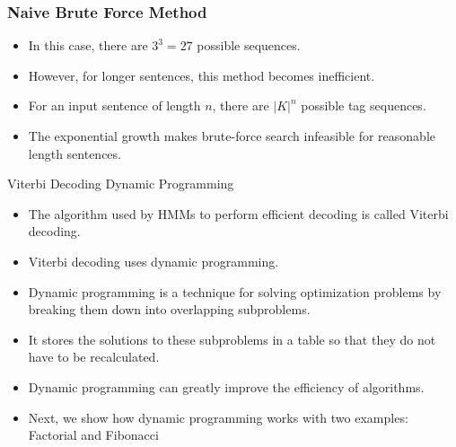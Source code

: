 \documentclass[handout]{beamer}
\begin{document}
\begin{frame}
\frametitle{Naive Brute Force Method}
\scriptsize

\begin{itemize}

    
    \item In this case, there are $3^3 = 27$ possible sequences.
    
    \item However, for longer sentences, this method becomes inefficient.
    
    \item For an input sentence of length $n$, there are $|K|^n$ possible tag sequences.
    
    \item The exponential growth makes brute-force search infeasible for reasonable length sentences.
\end{itemize}

\end{frame}


\begin{frame}{Viterbi Decoding Dynamic Programming}
\scriptsize

  \begin{itemize}
    \item The algorithm used by HMMs to perform efficient decoding is called Viterbi decoding.
    \item Viterbi decoding uses dynamic programming.
    \item Dynamic programming is a technique for solving optimization problems by breaking them down into overlapping subproblems.
    \item It stores the solutions to these subproblems in a table so that they do not have to be recalculated.
    \item Dynamic programming can greatly improve the efficiency of algorithms.
    \item Next, we show how dynamic programming works with two examples: Factorial and Fibonacci
  \end{itemize}

\end{frame}
\end{document}
